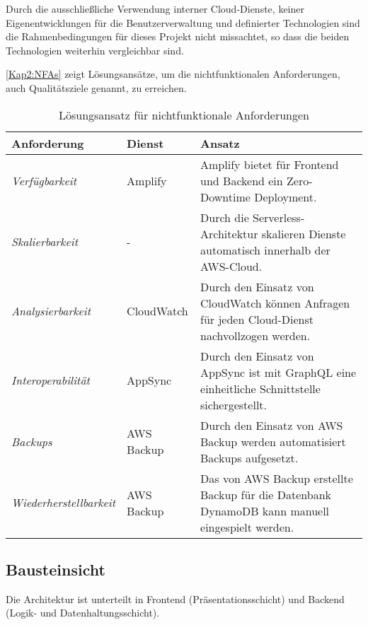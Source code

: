 Durch die ausschließliche Verwendung interner Cloud-Dienste, keiner Eigenentwicklungen für die Benutzerverwaltung und definierter Technologien sind die Rahmenbedingungen für dieses Projekt nicht missachtet, so dass die beiden Technologien weiterhin vergleichbar sind.

\autoref{Kap2:NFAs} zeigt Lösungsansätze, um die nichtfunktionalen Anforderungen, auch Qualitätsziele genannt, zu erreichen.

\begin{table}[h]
  \caption{Lösungsansatz für nichtfunktionale Anforderungen}
  \label{Kap2:NFAs}
  \renewcommand{\arraystretch}{1.2}
  \centering
  \sffamily
  \begin{footnotesize}
    \begin{tabularx}{0.9\textwidth}{l l X}
      \toprule
      \textbf{Anforderung} & \textbf{Dienst} & \textbf{Ansatz}\\
      \midrule
        \emph{Verfügbarkeit} & Amplify & Amplify bietet für Frontend und Backend ein Zero-Downtime Deployment. \\
        \emph{Skalierbarkeit} & - & Durch die Serverless-Architektur skalieren Dienste automatisch innerhalb der \ac{AWS}-Cloud.\\
        \emph{Analysierbarkeit} & CloudWatch & Durch den Einsatz von CloudWatch können Anfragen für jeden Cloud-Dienst nachvollzogen werden.\\
        \emph{Interoperabilität} & AppSync & Durch den Einsatz von AppSync ist mit GraphQL eine einheitliche Schnittstelle sichergestellt.\\
        \emph{Backups} & AWS Backup & Durch den Einsatz von AWS Backup werden automatisiert Backups aufgesetzt.\\
        \emph{Wiederherstellbarkeit} & AWS Backup &  Das von AWS Backup erstellte Backup für die Datenbank DynamoDB kann manuell eingespielt werden.\\
      \bottomrule
    \end{tabularx}
  \end{footnotesize}
  \rmfamily
\end{table}

\subsection{Bausteinsicht}

Die Architektur ist unterteilt in Frontend (Präsentationsschicht) und Backend (Logik- und Datenhaltungsschicht).

